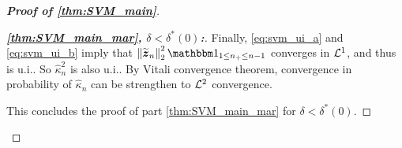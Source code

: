 \begin{proof}[\textbf{Proof of \cref{thm:SVM_main}}]
\begin{proof}[\textbf{\emph{\ref{thm:SVM_main_mar}, $\delta < \delta^*(0)$:}}]

Finally, \cref{eq:svm_ui_a} and \eqref{eq:svm_ui_b} imply that $\norm{ \wt \zz_n }_2^2 \ind_{1 \le n_+ \le n-1}$ converges in $\mathcal{L}^1$, and thus is u.i.. So $\hat\kappa_n^2$ is also u.i.. By Vitali convergence theorem, convergence in probability of $\hat\kappa_n$ can be strengthen to $\mathcal{L}^2$ convergence. 

This concludes the proof of part \ref{thm:SVM_main_mar} for $\delta < \delta^*(0)$.
\end{proof}







\end{proof}
